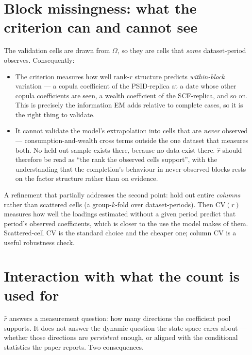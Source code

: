 \documentclass[11pt]{article}
\begin{document}
\section{Block missingness: what the criterion can and cannot see}

The validation cells are drawn from $\Omega$, so they are cells that
\emph{some} dataset-period observes. Consequently:

\begin{itemize}[leftmargin=*]
  \item The criterion measures how well rank-$r$ structure predicts
        \emph{within-block} variation --- a copula coefficient of the
        PSID-replica at a date whose other copula coefficients are seen, a
        wealth coefficient of the SCF-replica, and so on. This is precisely the
        information EM adds relative to complete cases, so it is the right thing
        to validate.
  \item It cannot validate the model's extrapolation into cells that are
        \emph{never} observed --- consumption-and-wealth cross terms outside the
        one dataset that measures both. No held-out sample exists there, because
        no data exist there. $\hat r$ should therefore be read as ``the rank the
        observed cells support'', with the understanding that the completion's
        behaviour in never-observed blocks rests on the factor structure rather than
        on evidence.
\end{itemize}

A refinement that partially addresses the second point: hold out entire
\emph{columns} rather than scattered cells (a group-$k$-fold over
dataset-periods). Then $\mathrm{CV}(r)$ measures how well the loadings estimated
without a given period predict that period's observed coefficients, which is
closer to the use the model makes of them. Scattered-cell CV is the standard
choice and the cheaper one; column CV is a useful robustness check.

\section{Interaction with what the count is used for}

$\hat r$ answers a measurement question: how many directions the coefficient
pool supports. It does not answer the dynamic question the state space cares
about --- whether those directions are \emph{persistent} enough, or aligned with
the conditional statistics the paper reports. Two consequences.
\end{document}
